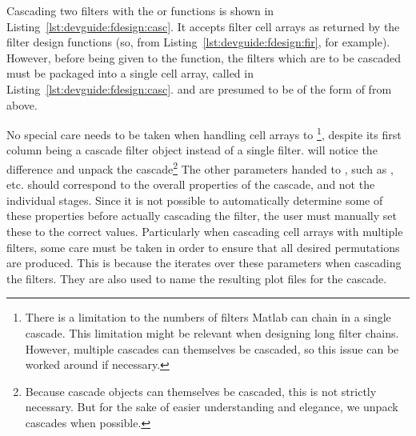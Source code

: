\vspace{2ex}
\vspace{2ex}

Cascading two filters with the  or  functions
is  shown in  Listing~\ref{lst:devguide:fdesign:casc}. It accepts  filter cell
arrays  as  returned  by  the  filter design  functions  (so,    from
\mbox{Listing~\ref{lst:devguide:fdesign:fir}},  for example). However,  before
being  given to  the   function, the  filters which  are to  be
cascaded must  be packaged into a  single cell array, called   in
\mbox{Listing~\ref{lst:devguide:fdesign:casc}}.   and  are
presumed to be of the form of  from above.

No special care  needs to be taken when handling   cell arrays to
\footnote{%
    There is  a limitation  to the numbers  of filters Matlab  can chain  in a
    single  cascade. This limitation  might  be relevant  when designing  long
    filter chains. However,  multiple cascades can themselves  be cascaded, so
    this issue can be worked around if necessary.%
},
despite  its first  column  being  a cascade  filter  object
instead of  a single  filter.  will  notice the  difference and
unpack the cascade\footnote{
    Because cascade objects  can themselves be cascaded, this  is not strictly
    necessary.   But for  the sake  of easier  understanding and  elegance, we
    unpack cascades when possible.%
}
The other parameters  handed to , such  as , 
etc. should correspond  to the overall properties of the  cascade, and not the
individual stages. Since it is not possible to automatically determine some of
these properties before actually cascading  the filter, the user must manually
set these to the correct  values. Particularly when cascading cell arrays with
multiple filters, some care must be taken  in order to ensure that all desired
permutations are  produced. This is because the   iterates over
these parameters  when cascading the filters. They  are also used to  name the
resulting plot files for the cascade.

